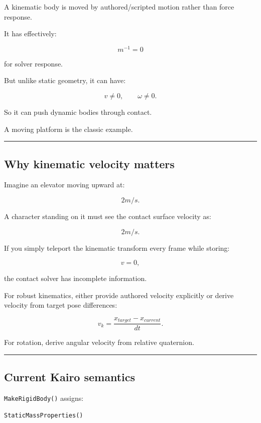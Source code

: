 A kinematic body is moved by authored/scripted motion rather than force response.

It has effectively:

\[
m^{-1}=0
\]

for solver response.

But unlike static geometry, it can have:

\[
v\neq0,
\qquad
\omega\neq0.
\]

So it can push dynamic bodies through contact.

A moving platform is the classic example.

\begin{center}\rule{0.5\linewidth}{0.5pt}\end{center}

\subsection{Why kinematic velocity matters}\label{06-engine-ii-ch037-why-kinematic-velocity-matters}

Imagine an elevator moving upward at:

\[
2m/s.
\]

A character standing on it must see the contact surface velocity as:

\[
2m/s.
\]

If you simply teleport the kinematic transform every frame while storing:

\[
v=0,
\]

the contact solver has incomplete information.

For robust kinematics, either provide authored velocity explicitly or derive velocity from target pose differences:

\[
v_k
=
\frac{x_{target}-x_{current}}{dt}.
\]

For rotation, derive angular velocity from relative quaternion.

\begin{center}\rule{0.5\linewidth}{0.5pt}\end{center}

\subsection{Current Kairo semantics}\label{06-engine-ii-ch037-current-kairo-semantics}

\texttt{MakeRigidBody()} assigns:

\begin{verbatim}
StaticMassProperties()
\end{verbatim}

